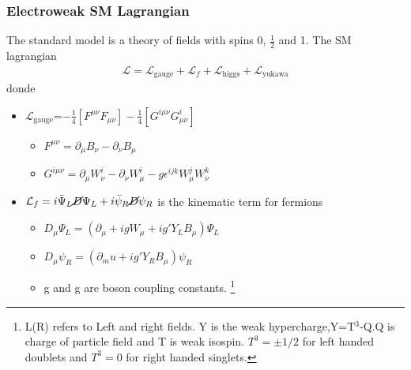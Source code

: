 \documentclass[11pt]{beamer}
\begin{document}
\begin{frame}
\frametitle{Electroweak SM Lagrangian}
The standard model is a theory of fields with spins 0, $\frac{1}{2}$ and 1. 
The  SM lagrangian 	
\begin{align*}
\mathcal{L}=\mathcal{L}_\text{gauge}+\mathcal{L}_f +\mathcal{L}_\text{higgs} + \mathcal{L}_\text{yukawa}
\end{align*}
donde 
\begin{itemize}
	\item $\mathcal{L}_\text{gauge}$=$ -\frac{1}{4}\left[F^{\mu\nu}F_{\mu\nu}\right]-\frac{1}{4}\left[G^{i\mu\nu}G^i_{\mu\nu}\right]$ 
	\begin{itemize}
		\item  $F^{\mu \nu}=\partial_\mu B_\nu -\partial_\nu B_\mu $
		\item  $G^{i\mu\nu}=\partial_\mu W^i_\nu -\partial_\nu W^i_\mu -g\epsilon^{ijk}W^j_\mu W^k_\nu $
	\end{itemize}
	\item $\mathcal{L}_f=i\bar{\Psi}_L \cancel{D}{\Psi}_L+i\bar{\psi}_R \cancel{D}{\psi}_R  $ is the kinematic term for fermions 
	\begin{itemize}
		\item $D_\mu {\Psi}_L=\left(\partial_\mu+igW_\mu+ig'Y_LB_\mu\right)\Psi_L$
		\item $D_\mu \psi_R=\left(\partial_mu +ig' Y_RB_\mu\right)\psi_R $
		\item g and g are boson coupling constants.
\footnote{L(R) refers to Left and right fields.
Y is the  weak hypercharge,Y=T$^3$-Q.Q is charge of particle field and T is weak isospin. $T^3=\pm 1/2$ for left handed doublets and $T^3=0$ for right handed singlets.}  
	\end{itemize}
\end{itemize}
\end{frame}
\end{document}
